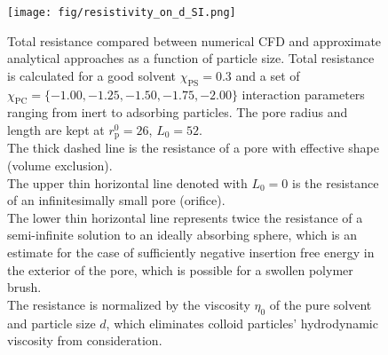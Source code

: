 \documentclass[10pt, a4paper]{article}
\begin{document}
\begin{multicols}{2}
\begin{figure}[H]
    \centering
    \texttt{[image: fig/resistivity\_on\_d\_SI.png]}
    \caption{
        Total resistance compared between numerical CFD and approximate analytical approaches as a function of particle size.
        Total resistance is calculated for a good solvent $\chi_{\text{PS}} = 0.3$ and a set of $\chi_{\text{PC}} = \{-1.00, -1.25, -1.50, -1.75, -2.00\}$ interaction parameters ranging from inert to adsorbing particles.
        The pore radius and length are kept at $r_{\text{p}}^{0} = 26$, $L_{0} = 52$.
        \\
        The thick dashed line is the resistance of a pore with effective shape (volume exclusion).
        \\
        The upper thin horizontal line denoted with $L_{0} = 0$ is the resistance of an infinitesimally small pore (orifice).
        \\
        The lower thin horizontal line represents twice the resistance of a semi-infinite solution to an ideally absorbing sphere, which is an estimate for the case of sufficiently negative insertion free energy in the exterior of the pore, which is possible for a swollen polymer brush.
        \\
        The resistance is normalized by the viscosity $\eta_{0}$ of the pure solvent and particle size $d$, which eliminates colloid particles' hydrodynamic viscosity from consideration.
        }
    \label{fig:CFD_comparison}
\end{figure}


\end{multicols}
\end{document}
